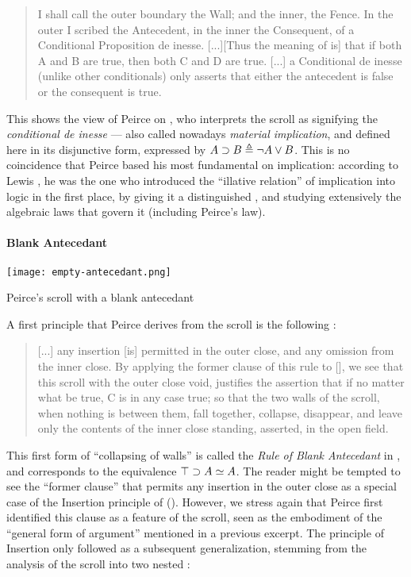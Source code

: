 \begin{quote}
  I shall call the outer boundary the Wall; and the inner, the Fence. In the
outer I scribed the Antecedent, in the inner the Consequent, of a Conditional
Proposition de inesse. [...][Thus the meaning of  is] that if
both A and B are true, then both C and D are true. [...] a Conditional de inesse
(unlike other conditionals) only asserts that either the antecedent is false or
the consequent is true. 
\end{quote}

This shows the  view of Peirce on , who interprets the scroll as
signifying the \textit{conditional de inesse} --- also called nowadays
\emph{material implication}, and defined here in its disjunctive form, expressed
 by $A \supset B \triangleq \neg A \lor B$. This is no coincidence that
Peirce based his most fundamental  on implication: according to Lewis
, he was the one who introduced the
``illative relation'' of implication into  logic in the first place, by
giving it a distinguished , and studying extensively the algebraic laws
that govern it (including Peirce's law).

\paragraph{Blank Antecedant}

\begin{marginfigure}
  \texttt{[image: empty-antecedant.png]}
  \caption{Peirce's scroll with a blank antecedant}
\end{marginfigure}

A first principle that Peirce derives from the scroll is the following
\cite[p.~534]{peirce_prolegomena_1906}:

\begin{quote}
  [...] any insertion [is] permitted in the outer close, and any omission from
the inner close. By applying the former clause of this rule to
[], we see that this scroll with the outer close void,
justifies the assertion that if no matter what be true, C is in any case true;
so that the two walls of the scroll, when nothing is between them, fall
together, collapse, disappear, and leave only the contents of the inner close
standing, asserted, in the open field.
\end{quote}

This first form of ``collapsing of walls'' is called the \emph{Rule of Blank
Antecedant} in \cite{minghui_graphical_2019}, and corresponds  to
the equivalence $\top \supset A \simeq A$. The reader might be tempted to see
the ``former clause'' that permits any insertion in the outer close as a special
case of the Insertion principle of  (). However, we
stress again that Peirce first identified this clause as a feature of the
scroll, seen as the  embodiment of the ``general form of argument''
mentioned in a previous excerpt. The principle of Insertion only followed as a
subsequent generalization, stemming from the analysis of the scroll into two
nested  \cite[p.~535]{peirce_prolegomena_1906}:

